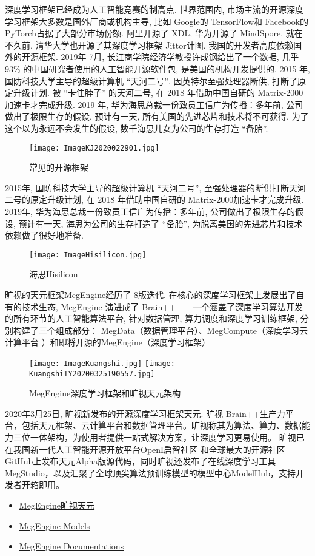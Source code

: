 深度学习框架已经成为人工智能竞赛的制高点. 世界范围内, 市场主流的开源深度学习框架大多数是国外厂商或机构主导, 比如 Google的 TensorFlow和 Facebook的 PyTorch占据了大部分市场份额.
阿里开源了 XDL, 华为开源了 MindSpore. 就在不久前, 清华大学也开源了其深度学习框架 Jittor计图.
我国的开发者高度依赖国外的开源框架. 2019年 7月, 长江商学院经济学教授许成钢给出了一个数据, 几乎 93\% 的中国研究者使用的人工智能开源软件包, 是美国的机构开发提供的.
2015 年, 国防科技大学主导的超级计算机 “天河二号”, 因英特尔至强处理器断供, 打断了原定升级计划. 被 “卡住脖子” 的天河二号, 在 2018 年借助中国自研的 Matrix-2000 加速卡才完成升级.
2019 年, 华为海思总裁一份致员工信广为传播：多年前, 公司做出了极限生存的假设, 预计有一天, 所有美国的先进芯片和技术将不可获得. 为了这个以为永远不会发生的假设, 数千海思儿女为公司的生存打造 “备胎”.
\begin{figure}[H]
\centering
\texttt{[image: ImageKJ2020022901.jpg]}
\caption{常见的开源框架}
\label{VSstudio2019CNTK013001}
\end{figure}
2015年, 国防科技大学主导的超级计算机 “天河二号”, 至强处理器的断供打断天河二号的原定升级计划, 在 2018 年借助中国自研的 Matrix-2000加速卡才完成升级.
2019年, 华为海思总裁一份致员工信广为传播：多年前, 公司做出了极限生存的假设, 预计有一天, 海思为公司的生存打造了 “备胎”, 为脱离美国的先进芯片和技术依赖做了很好地准备.
\begin{figure}[H]
\centering
\texttt{[image: ImageHisilicon.jpg]}
\caption{海思Hisilicon}
\label{ImageHisilicon2020001}
\end{figure}
旷视的天元框架MegEngine经历了 8版迭代. 在核心的深度学习框架上发展出了自有的技术生态, MegEngine 演进成了 Brain++——一个涵盖了深度学习算法开发的所有环节的人工智能算法平台, 针对数据管理, 算力调度和深度学习训练框架, 分别构建了三个组成部分： MegData（数据管理平台）、MegCompute（深度学习云计算平台 ）和即将开源的MegEngine（深度学习框架）
\begin{figure}[H]
\centering
\texttt{[image: ImageKuangshi.jpg]}
\texttt{[image: KuangshiTY20200325190557.jpg]}
\caption{MegEngine深度学习框架和旷视天元架构}
\label{ImageKuangshi2020001}
\end{figure}
2020年3月25日, 旷视新发布的开源深度学习框架天元. 旷视 Brain++生产力平台，包括天元框架、云计算平台和数据管理平台。旷视称其为算法、算力、数据能力三位一体架构，为使用者提供一站式解决方案，让深度学习更易使用。
旷视已在我国新一代人工智能开源开放平台OpenI启智社区 和全球最大的开源社区 GitHub上发布天元Alpha版源代码，同时旷视还发布了在线深度学习工具MegStudio，以及汇聚了全球顶尖算法预训练模型的模型中心ModelHub，支持开发者开箱即用。
\begin{itemize}
\item \href{https://github.com/MegEngine/Models}{MegEngine旷视天元}
\item \href{https://github.com/MegEngine/Models}{MegEngine Models}
\item \href{https://github.com/zggl/Docs}{MegEngine Documentations}
\end{itemize}
